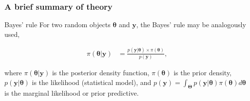 \documentclass[12pt, compress]{beamer}
\begin{document}
\begin{frame}
	\frametitle{A brief summary of theory}
	\begin{block}{Bayes' rule}
		For two random objects $\boldsymbol{\theta}$ and $\boldsymbol{y}$, the Bayes' rule may be analogously used,
	\end{block}
	
	\begin{align}\label{eq2}
	\pi(\boldsymbol{\theta}|\boldsymbol{y})&=\frac{p(\boldsymbol{y}|\boldsymbol{\theta}) \times \pi(\boldsymbol{\theta})}{p(\boldsymbol{y})},
	\end{align}
	
	where $\pi(\boldsymbol{\theta}|\boldsymbol{y})$ is the posterior density function, $\pi(\boldsymbol{\theta})$ is the prior density, $p(\boldsymbol{y}|\boldsymbol{\theta})$ is the likelihood (statistical model), and  $p(\boldsymbol{y})=\int_{\boldsymbol{\Theta}}p(\boldsymbol{y}|\boldsymbol{\theta})\pi(\boldsymbol{\theta})d\boldsymbol{\theta}$ is the marginal likelihood or prior predictive. 	
\end{frame}

\end{document}
